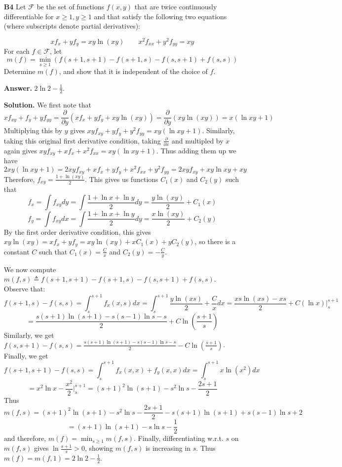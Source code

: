 \documentclass[11pt,a4paper]{article}
\newcommand{\<}{\langle}
\renewcommand{\>}{\rangle}
\begin{document}
\begin{enumerate}
	\item[\textbf{B4}] 
	Let $\mathcal{F}$ be the set of functions $f(x, y)$ that are twice continuously differentiable for $x\ge 1, y\ge 1$  and that satisfy
	the following two equations (where subscripts denote partial derivatives):
	
	\[
	xf_x + yf_y = xy\ln (xy)
	\qquad 
	x^2f_{xx}+y^2f_{yy} = xy
	\]
	For each $f\in\mathcal{F}$, let 
	\[
	m(f) = \min_{s\ge 1} (f(s+1, s+1) - f(s+1, s) - f(s, s+1) + f(s, s))
	\]
	Determine $m(f)$, and show that it is independent of the choice of $f$. 
	
	\textbf{Answer.} $2\ln 2 - \frac 12$. 
	
	\textbf{Solution.} 
	We first note that 
	\[
	xf_{xy} + f_y + yf_{yy} = \frac{\partial}{\partial y}(xf_x + yf_y + xy\ln (xy))
	=\frac{\partial}{\partial y}(xy\ln (xy))
	=x(\ln xy + 1)
	\]
	Multiplying this by $y$ gives $xyf_{xy} + yf_y + y^2f_{yy} = xy(\ln xy + 1)$. 
	Similarly, taking this original first derivative condition, 
	taking $\frac{\partial}{\partial x}$ and multipled by $x$ again gives 
	$xyf_{xy} + xf_x + x^2f_{xx} = xy(\ln xy + 1)$. 
	Thus adding them up we have 
	\[
	2xy(\ln xy + 1) = 2xyf_{xy} + xf_x + yf_y + x^2f_{xx} + y^2f_{yy} 
	=2xyf_{xy} + xy\ln xy + xy
	\]
	Therefore, $f_{xy} = \frac{1 + \ln (xy)}{2}$. 
	This gives us functions $C_1(x)$ and $C_2(y)$ such that 
	\[
	f_x = \int f_{xy} dy = \int \frac{1 + \ln x + \ln y}{2}dy = \frac{y\ln(xy)}{2} + C_1(x)
	\]\[
	f_y =  \int f_{xy} dx = \int \frac{1 + \ln x + \ln y}{2}dy = \frac{x\ln(xy)}{2} + C_2(y)
	\]
	By the first order derivative condition, this gives $xy\ln (xy)=xf_x + yf_y  = xy\ln(xy) + xC_1(x) + yC_2(y)$, 
	so there is a constant $C$ such that $C_1(x)=\frac{C}{x}$ and $C_2(y)=-\frac{C}{y}$. 
	
	We now compute $m(f, s)\triangleq f(s+1, s+1) - f(s+1, s) - f(s, s+1) + f(s, s)$. 
	Observe that: 
	\[
	f(s+1, s) - f(s, s) = \int_s^{s+1} f_x(x, s)dx
	=\int_s^{s+1}\frac{y\ln(xs)}{2} + \frac{C}{x}dx
	=\frac{xs\ln(xs) - xs}{2} + C(\ln x)|_s^{s+1}
	\]\[
	=\frac{s(s+1)\ln(s+1) - s(s-1)\ln s - s}{2} + C\ln(\frac{s + 1}{s})
	\]
	Similarly, we get $f(s, s + 1) - f(s, s) = \frac{s(s+1)\ln(s+1) - s(s-1)\ln s - s}{2} - C\ln(\frac{s + 1}{s})$. 
	Finally, we get 
	\[
	f(s + 1, s + 1) - f(s, s) 
	= \int_s^{s + 1} f_x(x, x) + f_y(x, x) dx
	= \int_s^{s+1} x\ln(x^2) dx 
	\]\[
	= x^2\ln x - \frac{x^2}{2}|_s^{s+1}
	=(s+1)^2\ln(s+1) - s^2\ln s - \frac{2s + 1}{2}
	\]
	Thus 
	\[
	m(f, s) = (s+1)^2\ln(s+1) - s^2\ln s - \frac{2s + 1}{2} - s(s+1)\ln(s+1) + s(s-1)\ln s + 2
	\]\[
	= (s+1)\ln (s+1) - s\ln s - \frac 12
	\]
	and therefore, $m(f) = \min_{s\ge 1} m(f, s)$. 
	Finally, differentiating w.r.t. $s$ on $m(f, s)$ gives $\ln\frac{s+1}{s} > 0$, 
	showing $m(f, s)$ is increasing in $s$. 
	Thus $m(f) = m(f, 1) = 2\ln 2 - \frac 12$. 
	

\end{enumerate}
\end{document}
